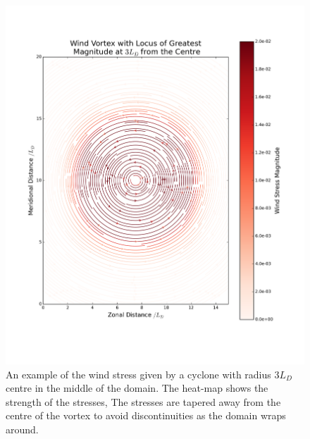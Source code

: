 \documentclass[12pt,a4paper]{report}
\begin{document}
\begin{figure}[t]
	\centering
	\begin{minipage}{0.55\linewidth}
		\includegraphics[width=\linewidth]{WindStressEg}
	\end{minipage}
	\quad
	\begin{minipage}{0.3\linewidth}
		\caption{An example of the wind stress given by a cyclone with
			radius $3 L_{D}$ centre in the middle of the domain. 
			The heat-map shows the strength of the stresses, 
			The  stresses are tapered away from the centre of the vortex to
			avoid discontinuities as the domain wraps around. }
		\label{fig:WindEg}
	\end{minipage}
\end{figure}
\end{document}

